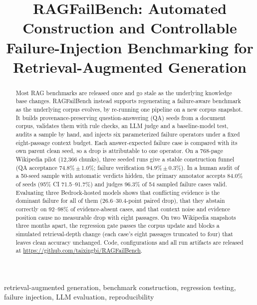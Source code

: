 \documentclass[conference]{IEEEtran}
\begin{document}
\title{RAGFailBench: Automated Construction and Controllable Failure-Injection Benchmarking for Retrieval-Augmented Generation}

\author{
}

\maketitle

\begin{abstract}
Most RAG benchmarks are released once and go stale as the underlying knowledge base changes.
RAGFailBench instead supports regenerating a failure-aware benchmark as the underlying corpus
evolves, by re-running one pipeline on a new corpus snapshot. It
builds provenance-preserving question-answering (QA) seeds from a document corpus, validates
them with rule checks, an LLM judge and a baseline-model test, audits a sample by hand, and
injects six parameterized failure operators under a fixed eight-passage context budget. Each
answer-expected failure case is compared with its own parent clean seed, so a drop is
attributable to one operator. On a 768-page Wikipedia pilot (12,366 chunks), three seeded runs give a stable
construction funnel (QA acceptance 74.8\%\,$\pm$\,1.0\%; failure verification 94.9\%\,$\pm$\,0.3\%).
In a human audit of a 50-seed sample with automatic verdicts hidden, the primary annotator
accepts 84.0\% of seeds (95\% CI 71.5--91.7\%) and judges 96.3\% of 54 sampled failure cases
valid. Evaluating three Bedrock-hosted models shows that conflicting
evidence is the dominant failure for all of them (26.6--30.4-point paired drop), that they
abstain correctly on 92--98\% of evidence-absent cases, and that context noise and evidence
position cause no measurable drop with eight passages. On two Wikipedia snapshots three months
apart, the regression gate passes the corpus update and blocks a simulated retrieval-depth
change (each case's eight passages truncated to four) that leaves clean accuracy unchanged. Code, configurations and all run
artifacts are released at \url{https://github.com/taixingbi/RAGFailBench}.
\end{abstract}

\begin{IEEEkeywords}
retrieval-augmented generation, benchmark construction, regression testing, failure injection, LLM evaluation, reproducibility
\end{IEEEkeywords}
\end{document}
